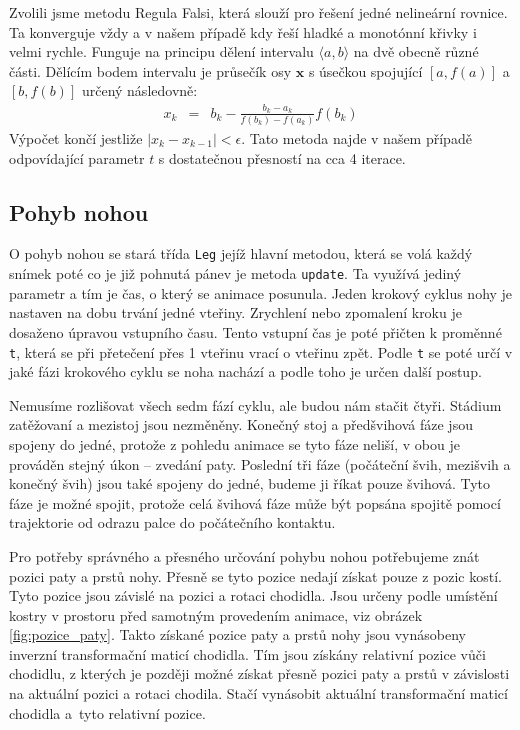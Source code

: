 Zvolili jsme metodu Regula Falsi, která slouží pro řešení jedné nelineární rovnice. Ta konverguje vždy a v našem případě kdy řeší hladké a monotónní křivky i velmi rychle. Funguje na principu dělení intervalu $\langle a, b \rangle$ na dvě obecně různé části. Dělícím bodem intervalu je průsečík osy $\mathbf{x}$ s úsečkou spojující $[a,f(a)]$ a $[b,f(b)]$ určený následovně:
\begin{eqnarray}
x_k &=& b_k - \frac{b_k-a_k}{f(b_k)-f(a_k)}f(b_k)
\label{r.regula_falsi}
\end{eqnarray}
Výpočet končí jestliže $|x_k - x_{k-1}| < \epsilon$. Tato metoda najde v našem případě odpovídající parametr $t$ s dostatečnou přesností na cca 4 iterace.


\subsection{Pohyb nohou}
O pohyb nohou se stará třída \texttt{Leg} jejíž hlavní metodou, která se volá každý snímek poté co je již pohnutá pánev je metoda \texttt{update}. Ta využívá jediný parametr a tím je čas, o který se animace posunula. Jeden krokový cyklus nohy je nastaven na dobu trvání jedné vteřiny. Zrychlení nebo zpomalení kroku je dosaženo úpravou vstupního času. Tento vstupní čas je poté přičten k proměnné \texttt{t}, která se při přetečení přes 1 vteřinu vrací o vteřinu zpět. Podle \texttt{t} se poté určí v jaké fázi krokového cyklu se noha nachází a podle toho je určen další postup.

Nemusíme rozlišovat všech sedm fází cyklu, ale budou nám stačit čtyři. Stádium zatěžovaní a mezistoj jsou nezměněny. Konečný stoj a předšvihová fáze jsou spojeny do jedné, protože z pohledu animace se tyto fáze neliší, v obou je prováděn stejný úkon -- zvedání paty. Poslední tři fáze (počáteční švih, mezišvih a konečný švih) jsou také spojeny do jedné, budeme ji říkat pouze švihová. Tyto fáze je možné spojit, protože celá švihová fáze může být popsána spojitě pomocí trajektorie od odrazu palce do počátečního kontaktu.

Pro potřeby správného a přesného určování pohybu nohou potřebujeme znát pozici paty a prstů nohy. Přesně se tyto pozice nedají získat pouze z pozic kostí. Tyto pozice jsou závislé na pozici a rotaci chodidla. Jsou určeny podle umístění kostry v prostoru před samotným provedením animace, viz obrázek \ref{fig:pozice_paty}. Takto získané pozice paty a prstů nohy jsou vynásobeny inverzní transformační maticí chodidla. Tím jsou získány relativní pozice vůči chodidlu, z kterých je později možné získat přesně pozici paty a prstů v závislosti na aktuální pozici a rotaci chodila. Stačí vynásobit aktuální transformační maticí chodidla a~tyto relativní pozice.

